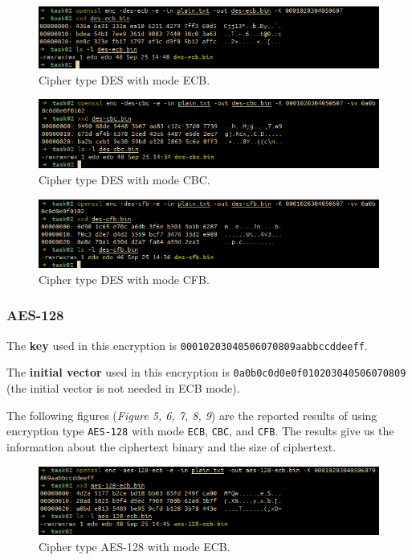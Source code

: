 \documentclass{article}
\begin{document}
\begin{figure}[!ht]
    \centering
    \includegraphics[scale=0.68]{task02_1.png}
    \caption{Cipher type DES with mode ECB.}
\end{figure}

\begin{figure}[!ht]
    \centering
    \includegraphics[scale=0.68]{task02_2.png}
    \caption{Cipher type DES with mode CBC.}
\end{figure}

\begin{figure}[!ht]
    \centering
    \includegraphics[scale=0.68]{task02_3.png}
    \caption{Cipher type DES with mode CFB.}
\end{figure}

\subsubsection{AES-128}

The \textbf{key} used in this encryption is \texttt{00010203040506070809aabbccddeeff}.

The \textbf{initial vector} used in this encryption is \texttt{0a0b0c0d0e0f010203040506070809}
(the initial vector is not needed in ECB mode).

The following figures (\textit{Figure 5, 6, 7, 8, 9}) are the reported results of using
encryption type \texttt{AES-128} with mode \texttt{ECB}, \texttt{CBC}, and \texttt{CFB}.
The results give us the information about the ciphertext binary and the size of
ciphertext.

\begin{figure}[!ht]
    \centering
    \includegraphics[scale=0.68]{task02_4.png}
    \caption{Cipher type AES-128 with mode ECB.}
\end{figure}
\end{document}
